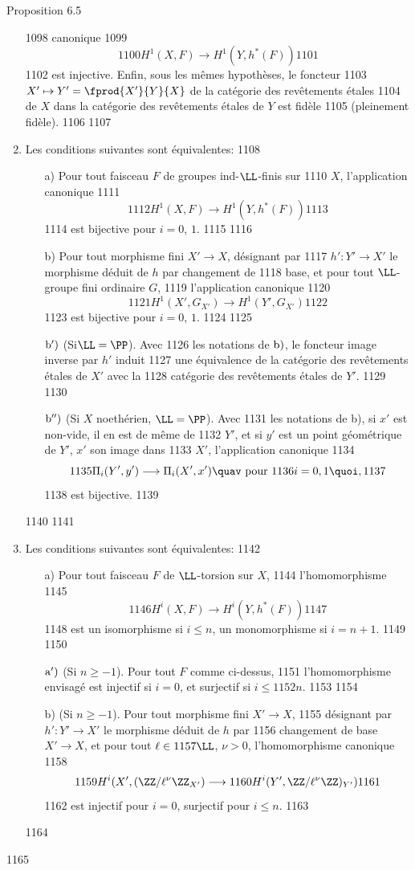 \begin{enonce*}{Proposition 6.5}
\begin{enumerate}
  1098	canonique
  1099	$$
  1100	H^1(X,F)\longrightarrow H^1(Y,h^{\ast}(F))
  1101	$$
  1102	est injective. Enfin, sous les mêmes hypothèses, le foncteur
  1103	$X'\mapsto Y'=\fprod{X'}{Y}{X}$ de la catégorie des revêtements étales
  1104	de $X$ dans la catégorie des revêtements étales de $Y$ est fidèle
  1105	(\resp pleinement fidèle).
  1106	
  1107	\item Les conditions suivantes sont équivalentes:
  1108	\begin{itemize}
  1109	\item[a)] Pour tout faisceau $F$ de groupes ind-$\LL$-finis sur
  1110	$X$, l'application canonique
  1111	$$
  1112	H^1(X,F)\longrightarrow H^1(Y,h^{\ast}(F))
  1113	$$
  1114	est bijective pour $i=0$, $1$.
  1115	
  1116	\item[b)] Pour tout morphisme fini $X'\rightarrow X$, désignant par
  1117	$h':Y'\rightarrow X'$ le morphisme déduit de $h$ par changement de
  1118	base, et pour tout $\LL$-groupe fini ordinaire $G$,
  1119	l'application canonique
  1120	$$
  1121	H^1(X',G_{X'})\longrightarrow H^1(Y',G_{X'})
  1122	$$
  1123	est bijective pour $i=0$, $1$.
  1124	
  1125	\item[${\rm b')}$] (Si\pageoriginale $\LL=\PP$). Avec
  1126	les notations de ${\rm b)}$, le foncteur image inverse par $h'$ induit
  1127	une équivalence de la catégorie des revêtements étales de $X'$ avec la
  1128	catégorie des revêtements étales de $Y'$.
  1129	
  1130	\item[${\rm b'')}$] (Si $X$ noethérien, $\LL=\PP$). Avec
  1131	les notations de {\rm b)}, si $x'$ est non-vide, il en est de même de
  1132	$Y'$, et si $y'$ est un point géométrique de $Y'$, $x'$ son image dans
  1133	$X'$, l'application canonique
  1134	$$
  1135	\Pi_i(Y',y')\longrightarrow \Pi_i(X', x')\quav \mbox{ pour }
  1136	i=0,1{\quoi},
  1137	$$
  1138	est bijective.
  1139	\end{itemize}
  1140	
  1141	\item Les conditions suivantes sont équivalentes:
  1142	\begin{itemize}
  1143	\item[a)] Pour tout faisceau $F$ de $\LL$-torsion sur $X$,
  1144	l'homomorphisme
  1145	$$
  1146	H^{i}(X,F)\longrightarrow H^{i}(Y,h^{\ast}(F))
  1147	$$
  1148	est un isomorphisme si $i\leq n$, un monomorphisme si $i=n+1$.
  1149	
  1150	\item[${\rm a')}$] (Si $n\geq -1$). Pour tout $F$ comme ci-dessus,
  1151	l'homomorphisme envisagé est injectif si $i=0$, et surjectif si $i\leq
  1152	n$.
  1153	
  1154	\item[b)] (Si $n\geq -1$). Pour tout morphisme fini $X'\rightarrow X$,
  1155	désignant par $h':Y'\rightarrow X'$ le morphisme déduit de $h$ par
  1156	changement de base $X'\rightarrow X$, et pour tout $\ell\in
  1157	\LL$, $\nu>0$, l'homomorphisme canonique
  1158	$$
  1159	H^{i}(X',(\ZZ/\ell^{\nu}\ZZ_{X'})\longrightarrow
  1160	H^{i}(Y',\ZZ/\ell^{\nu}\ZZ)_{Y'})
  1161	$$
  1162	est injectif pour $i=0$, surjectif pour $i\leq n$.
  1163	\end{itemize}
  1164	\end{enumerate}
  1165	\end{enonce*}
